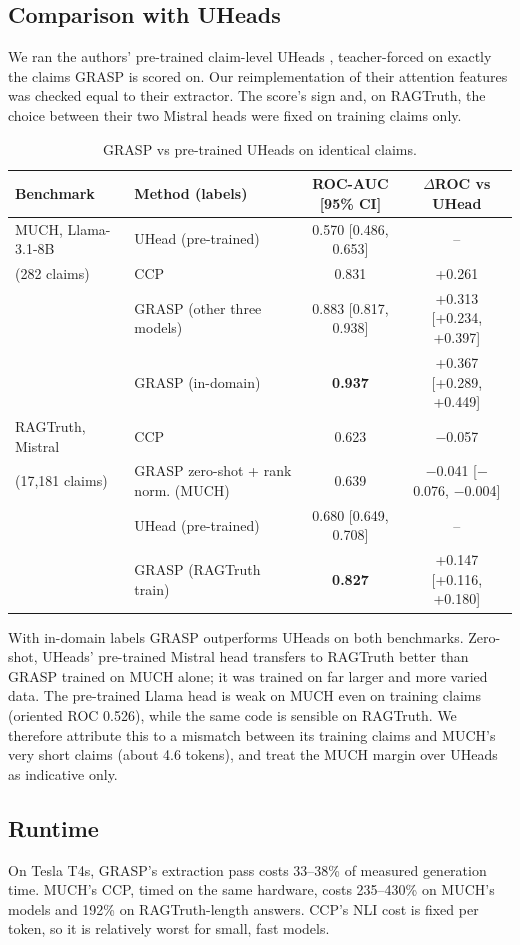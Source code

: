 \documentclass[11pt]{article}
\begin{document}
\subsection{Comparison with UHeads}
\label{sec:uheads}
We ran the authors' pre-trained claim-level UHeads \citep{shelmanov-etal-2025-head}, teacher-forced
on exactly the claims GRASP is scored on. Our reimplementation of their attention features was
checked equal to their extractor. The score's sign and, on RAGTruth, the choice between their two
Mistral heads were fixed on training claims only.
\begin{table}[t]
\centering\small
\begin{tabular}{llcc}
\toprule
Benchmark & Method (labels) & ROC-AUC [95\% CI] & $\Delta$ROC vs UHead \\
\midrule
MUCH, Llama-3.1-8B & UHead (pre-trained) & 0.570 [0.486, 0.653] & -- \\
(282 claims) & CCP & 0.831 & +0.261 \\
 & GRASP (other three models) & 0.883 [0.817, 0.938] & +0.313 [+0.234, +0.397] \\
 & GRASP (in-domain) & \textbf{0.937} & +0.367 [+0.289, +0.449] \\
\midrule
RAGTruth, Mistral & CCP & 0.623 & $-$0.057 \\
(17,181 claims) & GRASP zero-shot + rank norm. (MUCH) & 0.639 & $-$0.041 [$-$0.076, $-$0.004] \\
 & UHead (pre-trained) & 0.680 [0.649, 0.708] & -- \\
 & GRASP (RAGTruth train) & \textbf{0.827} & +0.147 [+0.116, +0.180] \\
\bottomrule
\end{tabular}
\caption{GRASP vs pre-trained UHeads on identical claims.}
\label{tab:uheads}
\end{table}
With in-domain labels GRASP outperforms UHeads on both benchmarks. Zero-shot, UHeads' pre-trained
Mistral head transfers to RAGTruth better than GRASP trained on MUCH alone; it was trained on far
larger and more varied data. The pre-trained Llama head is weak on MUCH even on training claims
(oriented ROC 0.526), while the same code is sensible on RAGTruth. We therefore attribute this to a
mismatch between its training claims and MUCH's very short claims (about 4.6 tokens), and treat the
MUCH margin over UHeads as indicative only.

\subsection{Runtime}
On Tesla T4s, GRASP's extraction pass costs 33--38\% of measured generation time. MUCH's CCP,
timed on the same hardware, costs 235--430\% on MUCH's models and 192\% on RAGTruth-length
answers. CCP's NLI cost is fixed per token, so it is relatively worst for small, fast models.
\end{document}
